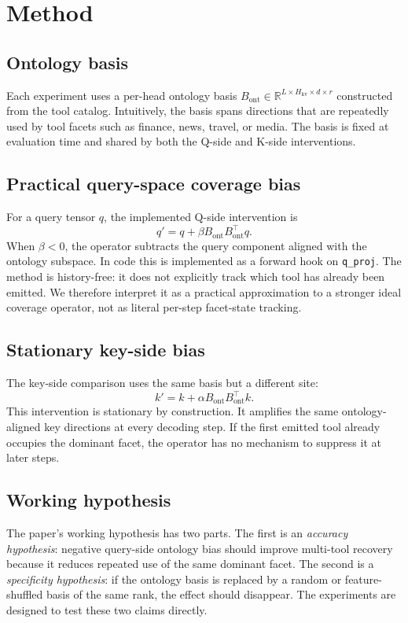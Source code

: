 \section{Method}

\subsection{Ontology basis}

Each experiment uses a per-head ontology basis $B_{\mathrm{ont}} \in \mathbb{R}^{L \times H_{\mathrm{kv}} \times d \times r}$ constructed from the tool catalog. Intuitively, the basis spans directions that are repeatedly used by tool facets such as finance, news, travel, or media. The basis is fixed at evaluation time and shared by both the Q-side and K-side interventions.

\subsection{Practical query-space coverage bias}

For a query tensor $q$, the implemented Q-side intervention is
\[
q' = q + \beta B_{\mathrm{ont}} B_{\mathrm{ont}}^\top q.
\]
When $\beta < 0$, the operator subtracts the query component aligned with the ontology subspace. In code this is implemented as a forward hook on \texttt{q\_proj}. The method is history-free: it does not explicitly track which tool has already been emitted. We therefore interpret it as a practical approximation to a stronger ideal coverage operator, not as literal per-step facet-state tracking.

\subsection{Stationary key-side bias}

The key-side comparison uses the same basis but a different site:
\[
k' = k + \alpha B_{\mathrm{ont}} B_{\mathrm{ont}}^\top k.
\]
This intervention is stationary by construction. It amplifies the same ontology-aligned key directions at every decoding step. If the first emitted tool already occupies the dominant facet, the operator has no mechanism to suppress it at later steps.

\subsection{Working hypothesis}

The paper's working hypothesis has two parts. The first is an \emph{accuracy hypothesis}: negative query-side ontology bias should improve multi-tool recovery because it reduces repeated use of the same dominant facet. The second is a \emph{specificity hypothesis}: if the ontology basis is replaced by a random or feature-shuffled basis of the same rank, the effect should disappear. The experiments are designed to test these two claims directly.
